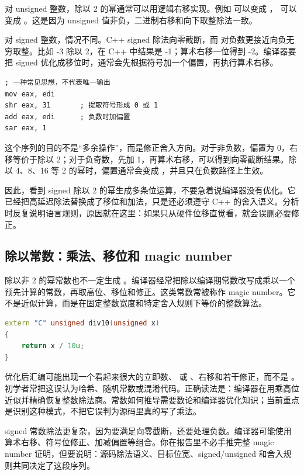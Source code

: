 对 unsigned 整数，除以 2 的幂通常可以用逻辑右移实现。例如  可以变成 ， 可以变成 。这是因为 unsigned 值非负，二进制右移和向下取整除法一致。

对 signed 整数，情况不同。C++ signed 除法向零截断，而  对负数更接近向负无穷取整。比如 -3 除以 2，在 C++ 中结果是 -1；算术右移一位得到 -2。编译器要把 signed  优化成移位时，通常会先根据符号加一个偏置，再执行算术右移。

\begin{lstlisting}
; 一种常见思想，不代表唯一输出
mov eax, edi
shr eax, 31       ; 提取符号形成 0 或 1
add eax, edi      ; 负数时加偏置
sar eax, 1
\end{lstlisting}

这个序列的目的不是“多余操作”，而是修正舍入方向。对于非负数，偏置为 0，右移等价于除以 2；对于负奇数，先加 1，再算术右移，可以得到向零截断结果。除以 4、8、16 等 2 的幂时，偏置通常会变成 ，并且只在负数路径上生效。

因此，看到 signed 除以 2 的幂生成多条位运算，不要急着说编译器没有优化。它已经把高延迟除法替换成了移位和加法，只是还必须遵守 C++ 的舍入语义。分析时反复说明语言规则，原因就在这里：如果只从硬件位移直觉看，就会误删必要修正。

\subsection{除以常数：乘法、移位和 magic number}

除以非 2 的幂常数也不一定生成 。编译器经常把除以编译期常数改写成乘以一个预先计算的常数，再取高位、移位和修正。这类常数常被称作 magic number。它不是近似计算，而是在固定整数宽度和特定舍入规则下等价的整数算法。

\begin{lstlisting}[language=C++]
extern "C" unsigned div10(unsigned x)
{
    return x / 10u;
}
\end{lstlisting}

优化后汇编可能出现一个看起来很大的立即数、 或 、右移和若干修正，而不是 。初学者常把这误认为哈希、随机常数或混淆代码。正确读法是：编译器在用乘高位近似并精确恢复整数除法商。常数如何推导需要数论和编译器优化知识；当前重点是识别这种模式，不把它误判为源码里真的写了乘法。

signed 常数除法更复杂，因为要满足向零截断，还要处理负数。编译器可能使用算术右移、符号位修正、加减偏置等组合。你在报告里不必手推完整 magic number 证明，但要说明：源码除法语义、目标位宽、signed/unsigned 和舍入规则共同决定了这段序列。

